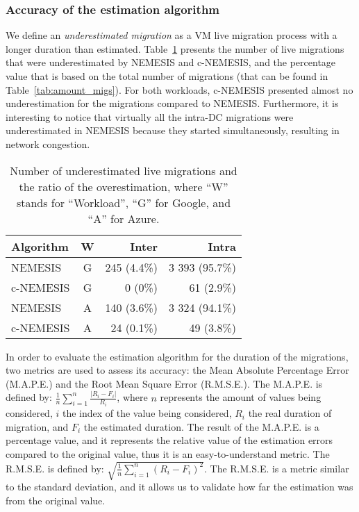  \subsubsection{Accuracy of the estimation algorithm}
 \label{sec:accuracy_smartgreens}
 We define an \emph{underestimated migration} as a VM live migration process with a longer duration than estimated. Table~\ref{tab:migs_under} presents the number of live migrations that were underestimated by NEMESIS and c-NEMESIS, and the percentage value that is based on the total number of migrations (that can be found in Table~\ref{tab:amount_migs}). For both workloads, c-NEMESIS presented almost no underestimation for the migrations compared to NEMESIS. Furthermore, it is interesting to notice that virtually all the intra-DC migrations were underestimated in NEMESIS because they started simultaneously, resulting in network congestion.
 
\begin{table}[h]
\caption{Number of underestimated live migrations and the ratio of the overestimation, where ``W'' stands for ``Workload'', ``G'' for Google, and ``A'' for Azure.}\label{tab:migs_under} \centering
\begin{tabular}{|l|c|r|r|}
  \hline
  \textbf{Algorithm} & \textbf{W}  & \textbf{Inter} & \textbf{Intra}   \\
  \hline
  NEMESIS  & G & 245 (4.4\%)   & 3 393 (95.7\%) \\
  \hline
  c-NEMESIS & G & 0 (0\%)  & 61 (2.9\%) \\
  \hline
  NEMESIS & A & 140 (3.6\%)   &  3 324 (94.1\%)   \\
  \hline
  c-NEMESIS & A & 24 (0.1\%)   & 49 (3.8\%) \\
  \hline  
\end{tabular}
\end{table}


In order to evaluate the estimation algorithm for the duration of the migrations, two metrics are used to assess its accuracy: the Mean Absolute Percentage Error (M.A.P.E.) and the Root Mean Square Error (R.M.S.E.). The M.A.P.E. is defined by: $ \frac{1}{n}\sum_{i=1}^{n}  \frac{| R_{i} - F_{i}|}{R_{i}}$, where $n$ represents the amount of values being considered, $i$ the index of the value being considered, $R_{i}$ the real duration of migration, and $F_{i}$ the estimated duration. The result of the M.A.P.E. is a percentage value, and it represents the relative value of the estimation errors compared to the original value, thus it is an easy-to-understand metric. The R.M.S.E. is defined by: $\sqrt{ \frac{1}{n}\sum_{i=1}^{n}  (R_{i} - F_{i})^2}$. The R.M.S.E. is a metric similar to the standard deviation, and it allows us to validate how far the estimation was from the original value.

